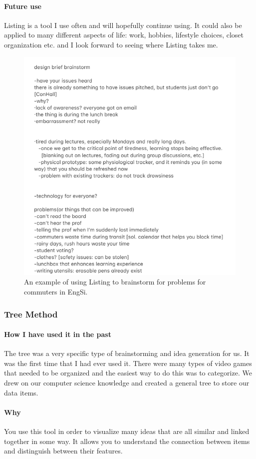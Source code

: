 \documentclass[paper=a4, fontsize=11pt]{article} %
\newcommand{\raisetarget}[2]%
{\bgroup
  \sbox0{#2}%
  \raisebox{\ht0}{\hypertarget{#1}{}}\usebox0%
\egroup}
\begin{document}
            \paragraph{Future use}
            Listing is a tool I use often and will hopefully continue using. It could also be applied to many different aspects of life: work, hobbies, lifestyle choices, closet organization etc. and I look forward to seeing where Listing takes me.
            \begin{figure}[H]
                \centering
	            \includegraphics[width=0.8\linewidth]{list.png}
	            \caption{An example of using Listing to brainstorm for problems for commuters in EngSi.}
            \end{figure}
        \raisetarget{treelink}{}
        \subsubsection{Tree Method}
            \paragraph{How I have used it in the past}
                    \cite{tree} The tree was a very specific type of brainstorming and idea generation for us. It was the first time that I had ever used it. There were many types of video games that needed to be organized and the easiest way to do this was to categorize. We drew on our computer science knowledge and created a general tree to store our data items.
                    \paragraph{Why} You use this tool in order to visualize many ideas that are all similar and linked together in some way. It allows you to understand the connection between items and distinguish between their features.
\end{document}

